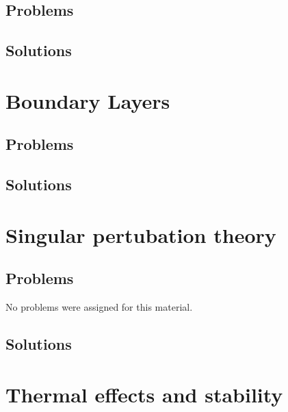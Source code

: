    \section{Problems}
      
   \section{Solutions}
      \shipoutAnswer

\chapter{Boundary Layers}
   
   
   
   
   
   \section{Problems}
      
      
   \section{Solutions}
      \shipoutAnswer

\chapter{Singular pertubation theory}
   
   
   
   \section{Problems}
      No problems were assigned for this material.
   \section{Solutions}
      \shipoutAnswer

\chapter{Thermal effects and stability}
   
   
   
